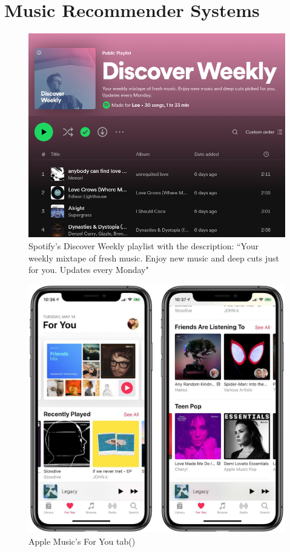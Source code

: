 \documentclass{l4proj}
\begin{document}
\section{Music Recommender Systems}
\begin{figure}
    \centering
    \includegraphics[width=0.75\linewidth]{images/discoverweekly.png}
    \caption{Spotify's Discover Weekly playlist with the description: ``Your weekly mixtape of fresh music. Enjoy new music and deep cuts just for you. Updates every Monday"}
    \label{fig:discover}
\end{figure}
\begin{figure}
    \centering
    \includegraphics[width=0.5\linewidth]{images/apple-music-for-you-514.jpg}
    \caption{Apple Music's For You tab(\cite{Broussard_2019})}
    \label{fig:apple}
\end{figure}
\end{document}
